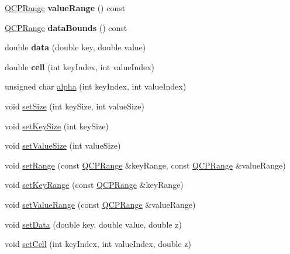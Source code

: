 \begin{DoxyCompactItemize}
\mbox{\hyperlink{class_q_c_p_range}{Q\+C\+P\+Range}} {\bfseries value\+Range} () const
\item 
\mbox{\label{class_q_c_p_color_map_data_ab7620248272c5ddd9a3f877f07179f6d}} 
\mbox{\hyperlink{class_q_c_p_range}{Q\+C\+P\+Range}} {\bfseries data\+Bounds} () const
\item 
\mbox{\label{class_q_c_p_color_map_data_a2c33807b008cdb9e1394245c294c0eaf}} 
double {\bfseries data} (double key, double value)
\item 
\mbox{\label{class_q_c_p_color_map_data_af51ecd21f347adbf87b4cce4e1f5cbd6}} 
double {\bfseries cell} (int key\+Index, int value\+Index)
\item 
unsigned char \mbox{\hyperlink{class_q_c_p_color_map_data_a4f7e6b7a97017400cbbd46f0660e68ea}{alpha}} (int key\+Index, int value\+Index)
\item 
void \mbox{\hyperlink{class_q_c_p_color_map_data_a0d9ff35c299d0478b682bfbcdd9c097e}{set\+Size}} (int key\+Size, int value\+Size)
\item 
void \mbox{\hyperlink{class_q_c_p_color_map_data_ac7ef70e383aface34b44dbde49234b6b}{set\+Key\+Size}} (int key\+Size)
\item 
void \mbox{\hyperlink{class_q_c_p_color_map_data_a0893c9e3914513048b45e3429ffd16f2}{set\+Value\+Size}} (int value\+Size)
\item 
void \mbox{\hyperlink{class_q_c_p_color_map_data_aad9c1c7c703c1339489fc730517c83d4}{set\+Range}} (const \mbox{\hyperlink{class_q_c_p_range}{Q\+C\+P\+Range}} \&key\+Range, const \mbox{\hyperlink{class_q_c_p_range}{Q\+C\+P\+Range}} \&value\+Range)
\item 
void \mbox{\hyperlink{class_q_c_p_color_map_data_a0738c485f3c9df9ea1241b7a8bb6a86e}{set\+Key\+Range}} (const \mbox{\hyperlink{class_q_c_p_range}{Q\+C\+P\+Range}} \&key\+Range)
\item 
void \mbox{\hyperlink{class_q_c_p_color_map_data_ada1b2680ba96a5f4175b6d341cf75d23}{set\+Value\+Range}} (const \mbox{\hyperlink{class_q_c_p_range}{Q\+C\+P\+Range}} \&value\+Range)
\item 
void \mbox{\hyperlink{class_q_c_p_color_map_data_afd2083ccfd6987ec94aa7ef8e91ca39a}{set\+Data}} (double key, double value, double z)
\item 
void \mbox{\hyperlink{class_q_c_p_color_map_data_a8e75eaf8746596319032a93f3d2d0683}{set\+Cell}} (int key\+Index, int value\+Index, double z)

\end{DoxyCompactItemize}
